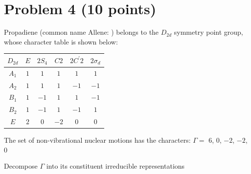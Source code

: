\documentclass[10pt, letterpaper]{memoir}
\begin{document}
	\newpage
	\section*{Problem 4 (10 points)}
	Propadiene (common name Allene: ) belongs to the $D_{2d}$ symmetry point group, whose character table is shown below:
	
	\begin{tabular}{c||c|c|c|c|c}
		$D_{2d}$ & $E$ & $2S_4$ & $C2$ & $2C^\prime 2$ & $2\sigma_d$ \\ \midrule \midrule
		$A_1$ & $1$ & $1$ & $1$ & $1$ & $1$ \\ \midrule
		$A_2$ & $1$ & $1$ & $1$ & $-1$ & $-1$\\ \midrule
		$B_1$ & $1$ & $-1$ & $1$ & $1$ & $-1$\\ \midrule
		$B_2$ & $1$ & $-1$ & $1$ & $-1$ & $1$\\ \midrule
		$E$ & $2$ & $0$ & $-2$ & $0$ & $0$
	\end{tabular}

	\noindent
	The set of non-vibrational nuclear motions has the characters: $\Gamma = $ $6$, $0$, $-2$, $-2$, $0$
	
	\noindent
	Decompose $\Gamma$ into its constituent irreducible representations
\end{document}
